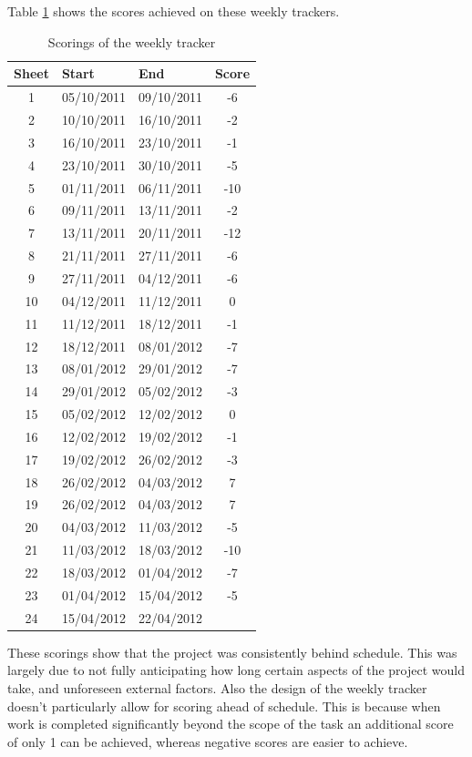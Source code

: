 \\
\\
Table \ref{tab:scorings} shows the scores achieved on these weekly trackers.
\begin{table}[H]
	\centering
	\begin{tabular}[c]{| c | l | l | c |}
		\hline
		Sheet	& Start	& End	& Score \\
		\hline
		1	& 05/10/2011	& 09/10/2011	& -6	\\
		2	& 10/10/2011	& 16/10/2011	& -2	\\
		3	& 16/10/2011	& 23/10/2011	& -1	\\
		4	& 23/10/2011	& 30/10/2011	& -5	\\
		5	& 01/11/2011	& 06/11/2011	& -10	\\
		6	& 09/11/2011	& 13/11/2011	& -2	\\
		7	& 13/11/2011	& 20/11/2011	& -12	\\
		8	& 21/11/2011	& 27/11/2011	& -6	\\
		9	& 27/11/2011	& 04/12/2011	& -6	\\
		10	& 04/12/2011	& 11/12/2011	& 0	\\
		11	& 11/12/2011	& 18/12/2011	& -1	\\
		12	& 18/12/2011	& 08/01/2012	& -7	\\
		13	& 08/01/2012	& 29/01/2012	& -7	\\
		14	& 29/01/2012	& 05/02/2012	& -3	\\
		15	& 05/02/2012	& 12/02/2012	& 0	\\
		16	& 12/02/2012	& 19/02/2012	& -1	\\
		17	& 19/02/2012	& 26/02/2012	& -3	\\
		18	& 26/02/2012	& 04/03/2012	& 7	\\
		19	& 26/02/2012	& 04/03/2012	& 7	\\
		20	& 04/03/2012	& 11/03/2012	& -5	\\
		21	& 11/03/2012	& 18/03/2012	& -10	\\
		22	& 18/03/2012	& 01/04/2012	& -7	\\
		23	& 01/04/2012	& 15/04/2012	& -5	\\
		24	& 15/04/2012	& 22/04/2012	& 	\\
		\hline
	\end{tabular}
	\caption{Scorings of the weekly tracker}
	\label{tab:scorings}
\end{table}

\noindent These scorings show that the project was consistently behind schedule.
This was largely due to not fully anticipating how long certain aspects of the project would take, and unforeseen external factors.
Also the design of the weekly tracker doesn't particularly allow for scoring ahead of schedule.
This is because when work is completed significantly beyond the scope of the task an additional score of only 1 can be achieved, whereas negative scores are easier to achieve.


